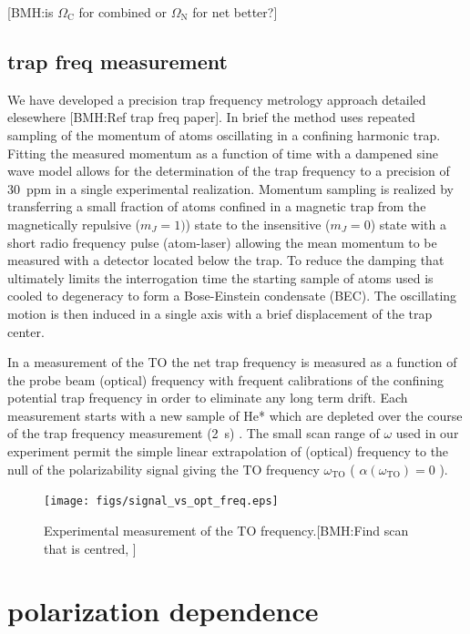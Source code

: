 \documentclass[aps,prl,
,reprint,
superscriptaddress,
onecolumn,
showpacs,preprintnumbers,
 amsmath,amssymb,
]{revtex4-1}
\newcommand{\brycecom}[1]{{\color{ProcessBlue}[BMH:{#1}]\normalcolor}} %
\begin{document}
\brycecom{is \(\Omega_{\text{C}}\) for combined or \(\Omega_{\text{N}}\) for net better?}
\subsection{trap freq measurement}
We have developed a precision trap frequency metrology approach detailed elesewhere \brycecom{Ref trap freq paper}. In brief the method uses repeated sampling of the momentum of atoms oscillating in a confining harmonic trap. Fitting the measured momentum as a function of time with a dampened sine wave model allows for the determination of the trap frequency to a precision of 30~ppm in a single experimental realization. Momentum sampling is realized by transferring a small fraction of atoms confined in a magnetic trap from the magnetically repulsive ($m_J=1)$) state to the insensitive ($m_J=0$) state with a short radio frequency pulse (atom-laser) allowing the mean momentum to be measured with a detector located below the trap. 
To reduce the damping that ultimately limits the interrogation time the starting sample of atoms used is cooled to degeneracy to form a Bose-Einstein condensate (BEC). The oscillating motion is then induced in a single axis with a brief displacement of the trap center. 

In a measurement of the TO the net trap frequency is measured as a function of the probe beam (optical) frequency with frequent calibrations of the confining potential trap frequency in order to eliminate any long term drift. Each measurement starts with a new sample of He* which are depleted over the course of the trap frequency measurement (2~s) . 
The small scan range of \(\omega\) used in our experiment permit the simple linear extrapolation of (optical) frequency to the null of the polarizability signal giving the TO frequency \(\omega_{\text{TO}}\) ( \(\alpha(\omega_{\text{TO}})=0\) ).


\begin{figure}[H] 
\centering
\texttt{[image: figs/signal\_vs\_opt\_freq.eps]}%
\caption{ 
Experimental measurement of the TO frequency.\brycecom{Find scan that is centred, }}
\label{fig:to_meas_sig_freq}
\end{figure}

\section{polarization dependence}
\end{document}
